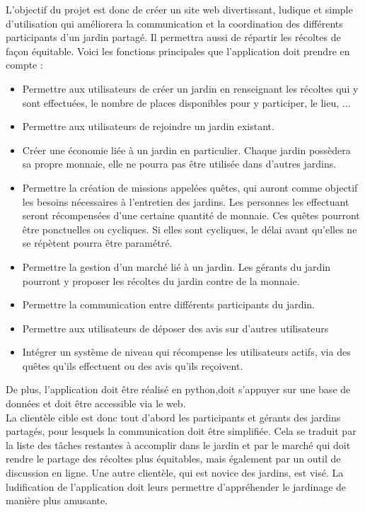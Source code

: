 \documentclass{report}
\begin{document}
    L'objectif du projet est donc de créer un site web divertissant, ludique et simple d’utilisation qui améliorera la communication et la coordination des différents participants d’un jardin partagé. Il permettra aussi de répartir les récoltes de façon équitable. Voici les fonctions principales que l'application doit prendre en compte :
    \begin{itemize}
        \item Permettre aux utilisateurs de créer un jardin en renseignant les récoltes qui y sont effectuées, le nombre de places disponibles pour y participer, le lieu, ...
        \item Permettre aux utilisateurs de rejoindre un jardin existant.
        \item Créer une économie liée à un jardin en particulier. Chaque jardin possèdera sa propre monnaie, elle ne pourra pas être utilisée dans d’autres jardins.
        \item Permettre la création de missions appelées quêtes, qui auront comme objectif les besoins nécessaires à l’entretien des jardins. Les personnes les effectuant seront récompensées d’une certaine quantité de monnaie. Ces quêtes pourront être ponctuelles ou cycliques. Si elles sont cycliques, le délai avant qu'elles ne se répètent pourra être paramétré.
        \item Permettre la gestion d'un marché lié à un jardin. Les gérants du jardin pourront y proposer les récoltes du jardin contre de la monnaie. \item Permettre la communication entre différents participants du jardin.
        \item Permettre aux utilisateurs de déposer des avis sur d'autres utilisateurs 
        \item Intégrer un système de niveau qui récompense les utilisateurs actifs, via des quêtes qu'ils effectuent ou des avis qu'ils reçoivent.
    \end{itemize}

    De plus, l'application doit être réalisé en python,doit s'appuyer sur une base de données et doit être accessible via le web.\\
    
    La clientèle cible est donc tout d'abord les participants et gérants des jardins partagés, pour lesquels la communication doit être simplifiée. Cela se traduit par la liste des tâches restantes à accomplir dans le jardin et par le marché qui doit rendre le partage des récoltes plus équitables, mais également par un outil de discussion en ligne.
    Une autre clientèle, qui est novice des jardins, est visé. La ludification de l'application doit leurs permettre d'appréhender le jardinage de manière plus amusante.
    
\end{document}
